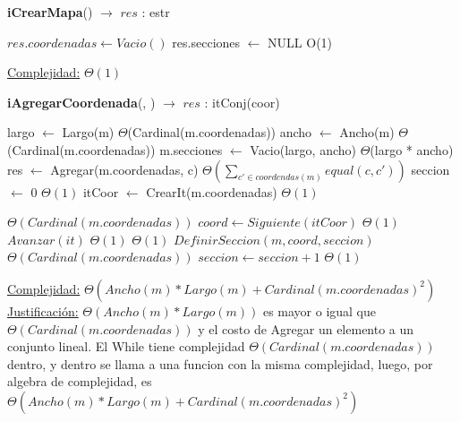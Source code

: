 \begin{Algoritmos}

\medskip
	
  	\medskip
  
\begin{algorithm}[H]{\textbf{iCrearMapa}() $\to$ $res$ : estr}
    	\begin{algorithmic}[1]
			\State $res.coordenadas \gets Vacio()$ 
			\State res.secciones $\gets$ NULL \Comment O(1)
			
			\medskip
			\Statex \underline{Complejidad:} $\Theta(1)$
    	\end{algorithmic}
\end{algorithm}

\begin{algorithm}[H]{\textbf{iAgregarCoordenada}(, ) $\to$ $res$ : itConj(coor)}
    	\begin{algorithmic}[1]
            \State  largo $\gets$ Largo(m)   \Comment $\Theta$(Cardinal(m.coordenadas))
            \State  ancho $\gets$ Ancho(m) \Comment $\Theta$(Cardinal(m.coordenadas))
            \State  m.secciones $\gets$ Vacio(largo, ancho) \Comment $\Theta$(largo * ancho)
			\State res $\gets$ Agregar(m.coordenadas, c) \Comment $\Theta\left(\displaystyle\sum_{c' \in coordendas(m)}equal(c,c')\right)$
            \State  seccion $\gets$ 0  \Comment $\Theta(1)$
            \State  itCoor $\gets$ CrearIt(m.coordenadas) \Comment $\Theta(1)$
			 
            			\Comment $\Theta(Cardinal(m.coordenadas))$
                \State $coord \gets Siguiente(itCoor)  $ \Comment $\Theta(1)$
			 	\State $Avanzar(it)$		\Comment $\Theta(1)$
                 \Comment $\Theta(1)$
                    \State $ DefinirSeccion(m, coord, seccion) $ \Comment $\Theta(Cardinal(m.coordenadas))$ 
                    \State $ seccion \gets seccion + 1 $ \Comment $\Theta(1)$
                \EndIf
			\EndWhile

			\medskip
			\Statex \underline{Complejidad:} $\Theta(Ancho(m) * Largo(m) + Cardinal(m.coordenadas)^2)$
			\Statex \underline{Justificación:} $\Theta(Ancho(m) * Largo(m))$ es mayor o igual que $\Theta(Cardinal(m.coordenadas))$ y el costo de Agregar un elemento a un conjunto lineal. El While tiene complejidad $\Theta(Cardinal(m.coordenadas))$ dentro, y dentro se llama a una funcion con la misma complejidad, luego, por algebra de complejidad, es $\Theta(Ancho(m) * Largo(m) + Cardinal(m.coordenadas)^2)$
    	\end{algorithmic}
\end{algorithm}


\end{Algoritmos}
